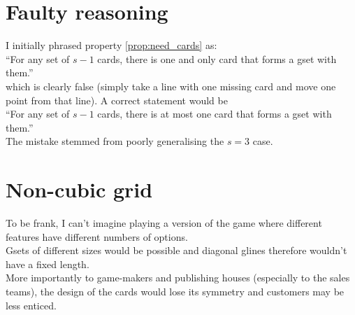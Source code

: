 \documentclass{article}
\theoremstyle{definition}
\theoremstyle{remark}
\begin{document}
\section{Faulty reasoning}\label{sec:faulty}

I initially phrased property \ref{prop:need_cards} as:\\
\indent ``For any set of $s-1$ cards, there is one and only card that forms a gset with them.''\\
which is clearly false (simply take a line with one missing card and move one point from that line).
A correct statement would be\\
\indent ``For any set of $s-1$ cards, there is at most one card that forms a gset with them.''\\
The mistake stemmed from poorly generalising the $s=3$ case.

\section{Non-cubic grid}

To be frank, I can't imagine playing a version of the game where different features have different numbers of options.\\
Gsets of different sizes would be possible and diagonal glines therefore wouldn't have a fixed length.\\
More importantly to game-makers and publishing houses (especially to the sales teams), the design of the cards would lose its symmetry and customers may be less enticed.
\end{document}
